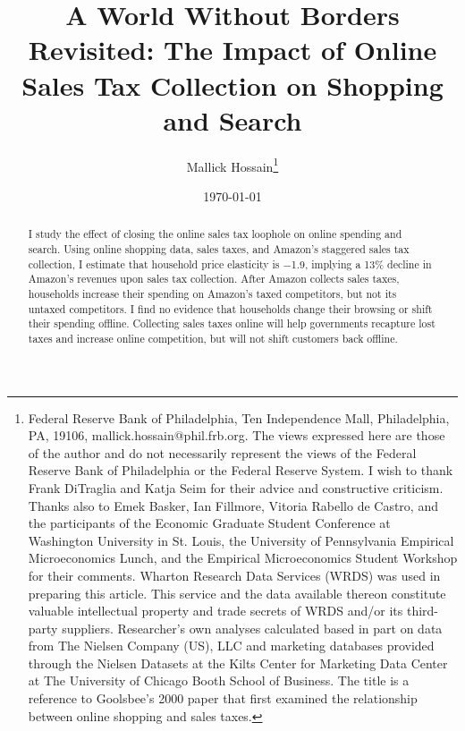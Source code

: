 \documentclass[AEJ,reviewmode]{AEA}
\begin{document}
\title{A World Without Borders Revisited: The Impact of Online Sales Tax Collection on Shopping and Search}
\author{Mallick Hossain\thanks{%
Federal Reserve Bank of Philadelphia, Ten Independence Mall, Philadelphia, PA, 19106, mallick.hossain@phil.frb.org. The views expressed here are those of the author and do not necessarily represent the views of the Federal Reserve Bank of Philadelphia or the Federal Reserve System. I wish to thank Frank DiTraglia and Katja Seim for their advice and constructive criticism. Thanks also to Emek Basker, Ian Fillmore, Vitoria Rabello de Castro, and the participants of the Economic Graduate Student Conference at Washington University in St. Louis, the University of Pennsylvania Empirical Microeconomics Lunch, and the Empirical Microeconomics Student Workshop for their comments. Wharton Research Data Services (WRDS) was used in preparing this article. This service and the data available thereon constitute valuable intellectual property and trade secrets of WRDS and/or its third-party suppliers. Researcher's own analyses calculated based in part on data from The Nielsen Company (US), LLC and marketing databases provided through the Nielsen Datasets at the Kilts Center for Marketing Data Center at The University of Chicago Booth School of Business. The title is a reference to Goolsbee's 2000 paper that first examined the relationship between online shopping and sales taxes.}}
\date{\today}

\begin{abstract}
I study the effect of closing the online sales tax loophole on online spending and search. Using online shopping data, sales taxes, and Amazon's staggered sales tax collection, I estimate that household price elasticity is $-$1.9, implying a 13\% decline in Amazon's revenues upon sales tax collection. After Amazon collects sales taxes, households increase their spending on Amazon's taxed competitors, but not its untaxed competitors. I find no evidence that households change their browsing or shift their spending offline. Collecting sales taxes online will help governments recapture lost taxes and increase online competition, but will not shift customers back offline.
\end{abstract}

\maketitle
\end{document}
